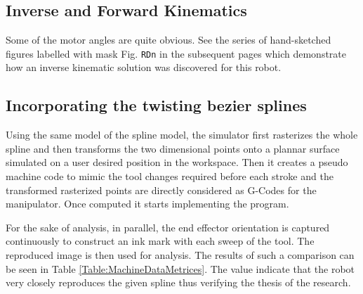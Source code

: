 {    \subsection{Inverse and Forward Kinematics}
    {
        Some of the motor angles are quite obvious. See the series of hand-sketched figures labelled with mask Fig. \texttt{RDn} in the subsequent pages which demonstrate how an inverse kinematic solution was discovered for this robot.
    }

    \subsection{Incorporating the twisting bezier splines} \label{Section:SimulatingRBS}
    {
        Using the same model of the spline model, the simulator first rasterizes the whole spline and then transforms the two dimensional points onto a plannar surface simulated on a user desired position in the workspace. Then it creates a pseudo machine code to mimic the tool changes required before each stroke and the transformed rasterized points are directly considered as G-Codes for the manipulator. Once computed it starts implementing the program.

        For the sake of analysis, in parallel, the end effector orientation is captured continuously to construct an ink mark with each sweep of the tool. The reproduced image is then used for analysis. The results of such a comparison can be seen in Table \ref{Table:MachineDataMetrices}. The value indicate that the robot very closely reproduces the given spline thus verifying the thesis of the research.

        \begin{table}[ht]
        \centering
        \caption{Benchmark of the mathematical accuracy of the twisting bezier spline curves with a simulated manipulator}
        \end{table}
    }
}
\clearpage 